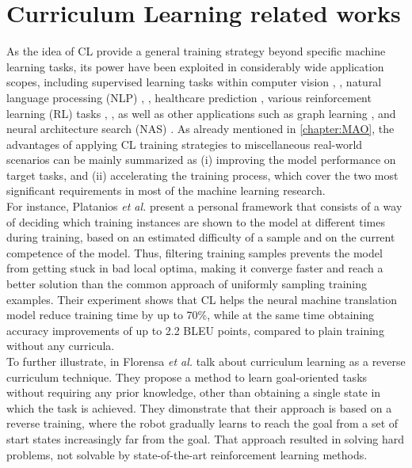 \section{Curriculum Learning related works}
As the idea of CL provide a general training strategy beyond specific machine learning
tasks, its power have been exploited in considerably wide application scopes, including supervised learning
tasks within computer vision \cite{guo2018curriculumnet}, \cite{jiang2014easy}, natural language processing (NLP) \cite{platanios2019competence}, \cite{tay2019simple}, healthcare prediction \cite{el2020student}, various
reinforcement learning (RL) tasks \cite{florensa2017reverse}, \cite{narvekar2017autonomous}, \cite{ren2018self} as well as other applications such
as graph learning \cite{gong2019multi}, \cite{qu2018curriculum} and neural architecture search (NAS) \cite{guo2018curriculumnet}. As already mentioned in \ref{chapter:MAO}, the advantages of applying CL
training strategies to miscellaneous real-world scenarios can be mainly summarized as (i) improving the model performance on 
target tasks, and (ii) accelerating the training process, which cover the two most significant 
requirements in most of the machine learning research. \\
For instance,
Platanios \textit{et al.} \cite{platanios2019competence} present 
a personal framework that consists of a way of deciding which training instances
are shown to the model at different times during training, based on 
an estimated difficulty of a sample and on the current competence
of the model. Thus, filtering training samples prevents the model from 
getting stuck in bad local optima, making it converge faster and reach
a better solution than the common approach of uniformly 
sampling training examples. Their experiment shows that CL helps the 
neural machine translation model reduce training time by up to 70\%, while at the 
same time obtaining accuracy improvements of up to 2.2 BLEU points, compared
to plain training without any curricula. \\ To further illustrate, in \cite{florensa2017reverse} Florensa 
\textit{et al.} talk about curriculum learning as a reverse curriculum technique. 
They propose a method to learn goal-oriented tasks without requiring
any prior knowledge, other than obtaining a single state in which
the task is achieved. They dimonstrate that their approach is 
based on a reverse training, where the robot gradually learns to reach 
the goal from a set of start states increasingly far from the goal.
That approach resulted in solving hard problems, not solvable 
by state-of-the-art reinforcement learning methods.

